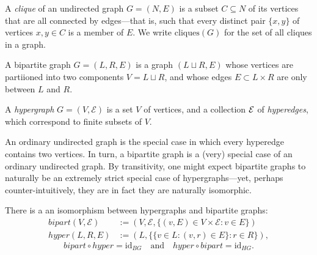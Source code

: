 A \emph{clique} of an undirected graph $G = (N,E)$ is a subset $C \subseteq N$ of its vertices that are all connected by edges---that is, such that every distinct pair $\{x,y\}$ of vertices $x,y \in C$ is a member of $E$.  We write $\mathrm{cliques}(G)$ for the set of all cliques in a graph. 

\begin{defn}
    A bipartite graph $G = (L, R, E)$ is a graph $(L \sqcup R, E)$ whose
    vertices are partiioned into two components $V = L \sqcup R$, 
    and whose edges $E \subset L \times R$ are only between $L$ and $R$. 
\end{defn}



\begin{defn}
    A \emph{hypergraph} $G = (V, \mathcal E)$ is a set $V$ of vertices,
    and a collection $\mathcal E$ of \emph{hyperedges}, which correspond to finite
    subsets of $V$. 
\end{defn}

An ordinary undirected graph is the special case in which every hyperedge contains two vertices.
In turn, a bipartite graph is a (very) special case of an ordinary undirected graph.
By transitivity, one might expect bipartite graphs to naturally be an extremely strict special case of hypergraphs---yet, perhaps counter-intuitively, they are in fact they are naturally isomorphic. 

\begin{prop} 
There is a 
an isomorphism
between hypergraphs and bipartite graphs:
\def\bigr{\mathit{bipart}}
\def\hygr{\mathit{hyper}}
\begin{align*}
    \bigr(V, \mathcal E) &:=  (V, \mathcal E, \{(v, E) \in V \times \mathcal E : v \in E \} ) \\
    \hygr(L, R, E) &:= (L, \{\{v \in L : (v,r) \in E\} : r \in R\}),
\end{align*}    
    \[
        \bigr \circ \hygr = \mathrm{id}_{BG}
        \quad\text{and}\quad
        \hygr \circ \bigr = \mathrm{id}_{HG}.
    \]
\end{prop}

